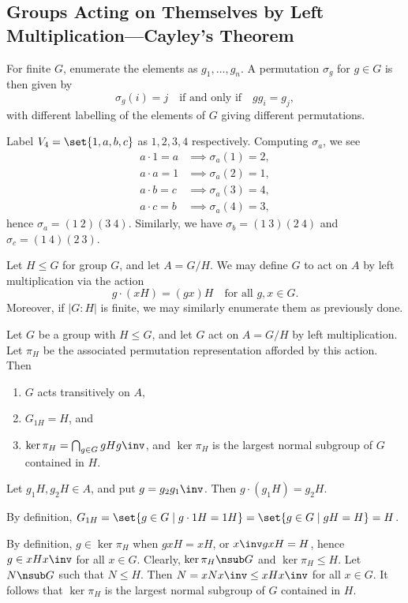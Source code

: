 \subsection{Groups Acting on Themselves by Left Multiplication---Cayley's Theorem} \label{sec4.2}

\note For finite $G$, enumerate the elements as $g_1, \ldots, g_n$. A permutation $\sigma_g$ for $g \in G$ is then given by
\[\sigma_g(i) = j \quad \text{if and only if} \quad gg_i = g_j,\]
with different labelling of the elements of $G$ giving different permutations. 

\ex Label $V_4 = \set{1, a, b, c}$ as $1, 2, 3, 4$ respectively. Computing $\sigma_a$, we see
\begin{align*}
    a \cdot 1 = a & \implies \sigma_a(1) = 2, \\
    a \cdot a = 1 & \implies \sigma_a(2) = 1, \\
    a \cdot b = c & \implies \sigma_a(3) = 4, \\
    a \cdot c = b & \implies \sigma_a(4) = 3,
\end{align*}
hence $\sigma_a = (1\ 2)(3\ 4)$. Similarly, we have $\sigma_b = (1\ 3)(2\ 4)$ and $\sigma_c = (1\ 4)(2\ 3)$.

\ex Let $H \leq G$ for group $G$, and let $A = G/H$. We may define $G$ to act on $A$ by left multiplication via the action
\[g \cdot (xH) = (gx)H \quad \text{for all $g, x \in G$}.\]
Moreover, if $|G : H|$ is finite, we may similarly enumerate them as previously done.

 \label{theo4.3}
Let $G$ be a group with $H \leq G$, and let $G$ act on $A = G/H$ by left multiplication. Let $\pi_H$ be the associated permutation representation afforded by this action. Then
\begin{enumerate}
    \item $G$ acts transitively on $A$,
    \item $G_{1H} = H$, and
    \item $\ker\pi_H = \bigcap_{g \in G} gHg\inv$, and $\ker\pi_H$ is the largest normal subgroup of $G$ contained in $H$.
\end{enumerate}

\begin{proofnum}
    \item Let $g_1H, g_2H \in A$, and put $g = g_2g_1\inv$. Then $g \cdot (g_1H) = g_2H$.
    \item By definition, $G_{1H} = \set{g \in G \mid g \cdot 1H = 1H} = \set{g \in G \mid gH = H} = H$.
    \item By definition, $g \in \ker\pi_H$ when $gxH = xH$, or $x\inv gxH = H$, hence $g \in xHx\inv$ for all $x \in G$. Clearly, $\ker\pi_H \nsub G$ and $\ker\pi_H \leq H$. Let $N \nsub G$ such that $N \leq H$. Then $N = xNx\inv \leq xHx\inv$ for all $x \in G$. It follows that $\ker\pi_H$ is the largest normal subgroup of $G$ contained in $H$.
\end{proofnum}

